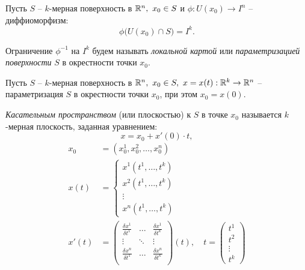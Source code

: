 \begin{definition}
    Пусть $S$ -- $k$-мерная поверхность в $\mathbb{R}^n, \ x_0 \in S$ и $\phi: U(x_0) \rightarrow I^n$ -- диффиоморфизм:
    \[
        \phi\big(U(x_0)\cap S\big) = I^k.
    \]

    Ограничение $\phi^{-1}$ на $I^k$ будем называть \emph{локальной картой} или \emph{параметризацией поверхности} $S$ в окрестности точки $x_0$.
\end{definition}

\begin{definition}
    Пусть $ S $ -- $ k $-мерная поверхность в $ \mathbb{R}^n, \ x_0 \in S, \ x = x(t):\mathbb{R}^k \rightarrow \mathbb{R}^n $ -- параметризация $ S $ в окрестности точки $ x_0 $, при этом $ x_0 = x(0) $.

    \emph{Касательным пространством} (или плоскостью) к $S$ в точке $x_0$ называется $k$-мерная плоскость, заданная уравнением:
    \begin{equation}\label{eq:8}
        x = x_0 + x'(0) \cdot t,
    \end{equation}
    \begin{align*}
        x_0   & = (x^1_0,x^2_0,\ldots,x^n_0)                                                   \\
        x(t)  & = \left\{\begin{array}{l}
                             x^1(t^1,\ldots,t^k) \\
                             x^2(t^1,\ldots,t^k) \\
                             \vdots              \\
                             x^n(t^1,\ldots,t^k)
                         \end{array}\right.                                                   \\
        x'(t) & = \left(\begin{matrix}
                                \frac{\delta x^1}{\delta t^1} & \ldots & \frac{\delta x^1}{\delta t^k} \\
                                \vdots                        & \ddots & \vdots                        \\
                                \frac{\delta x^n}{\delta t^1} & \ldots & \frac{\delta x^n}{\delta t^k} \\
                            \end{matrix}\right)(t), \quad t = \left(\begin{matrix}
                                                                        t^1 \\ t^2 \\ \vdots \\ t^k
                                                                    \end{matrix}\right)
    \end{align*}


\end{definition}
